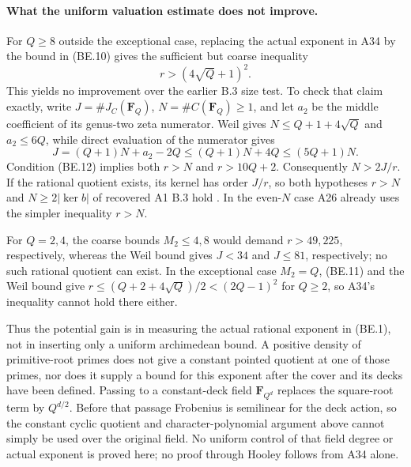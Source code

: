\documentclass[11pt,a4paper]{article}
\begin{document}
\paragraph{What the uniform valuation estimate does not improve.}
For $Q\ge8$ outside the exceptional case, replacing the
actual exponent in A34 by the bound in (BE.10) gives the
sufficient but coarse inequality
\[
                         r>(4\sqrt Q+1)^2.
 \tag{BE.12}
\]
This yields no improvement over the earlier B.3 size test.
To check that claim exactly, write $J=\#J_C(\mathbf F_Q)$,
$N=\#C(\mathbf F_Q)\ge1$, and let $a_2$ be the middle
coefficient of its genus-two zeta numerator. Weil gives
$N\le Q+1+4\sqrt Q$ and $a_2\le6Q$, while direct evaluation
of the numerator gives
\[
             J=(Q+1)N+a_2-2Q
                   \le(Q+1)N+4Q\le(5Q+1)N.
 \tag{BE.13}
\]
Condition (BE.12) implies both $r>N$ and $r>10Q+2$.
Consequently $N>2J/r$. If the rational quotient exists,
its kernel has order $J/r$, so both hypotheses
$r>N$ and $N\ge2|\ker b|$ of recovered A1 B.3 hold
\cite[B.3]{A1run}. In the even-$N$ case A26 already uses
the simpler inequality $r>N$.

For $Q=2,4$, the coarse bounds $M_2\le4,8$ would demand
$r>49,225$, respectively, whereas the Weil bound gives
$J<34$ and $J\le81$, respectively; no such rational
quotient can exist. In the exceptional case $M_2=Q$,
(BE.11) and the Weil bound give
$r\le(Q+2+4\sqrt Q)/2<(2Q-1)^2$ for $Q\ge2$, so A34's
inequality cannot hold there either.

Thus the potential gain is in measuring the actual rational
exponent in (BE.1), not in inserting only a uniform archimedean
bound. A positive density of primitive-root primes does not
give a constant pointed quotient at one of those primes, nor
does it supply a bound for this exponent after the cover and
its decks have been defined. Passing to a constant-deck field
$\mathbf F_{Q^d}$ replaces the square-root term by $Q^{d/2}$.
Before that passage Frobenius is semilinear for the deck action,
so the constant cyclic quotient and character-polynomial
argument above cannot simply be used over the original field.
No uniform control of that field degree or actual exponent is
proved here; no proof through Hooley follows from A34 alone.
\end{document}
